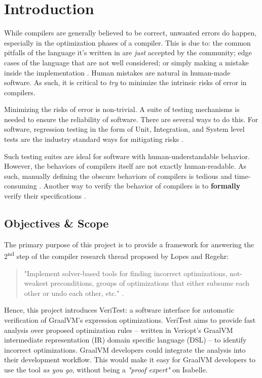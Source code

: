 \chapter{Introduction \label{sec:introduction}}

While compilers are generally believed to be correct, unwanted errors do happen, especially in the optimization phases of a compiler. 
This is due to: the common pitfalls of the 
language it's written in are \emph{just} accepted by the community; edge cases of the language that are not well considered; or simply making a 
mistake inside the implementation \cite[Sec. 1.2]{CompilerOptimization}. Human mistakes are natural in human-made software. As such, it is 
critical to \emph{try} to minimize the intrinsic risks of error in compilers.

Minimizing the risks of error is non-trivial. A suite of testing mechanisms is needed to ensure the reliability of software. 
There are several ways to do this. For software, regression testing in the form of Unit, Integration, and System level tests are the 
industry standard ways for mitigating risks \cite{testing}. 

Such testing suites are ideal for software with human-understandable behavior. However, 
the behaviors of compilers itself are not exactly human-readable. As such, manually defining the obscure behaviors of compilers is tedious and 
time-consuming \cite{compcertVerification}. Another way to verify the behavior of compilers is to \textbf{formally} 
verify their specifications \cite{compcertVerification}.

\section{Objectives \& Scope}

The primary purpose of this project is to provide a framework for answering the 2\textsuperscript{nd} step of the compiler research thread proposed by 
Lopes and Regehr:

\begin{quote}
    "Implement solver-based tools for finding incorrect optimizations, not-weakest
    preconditions, groups of optimizations that either subsume each other or
    undo each other, etc." \cite[p. 5]{CompilerOptimization}.
\end{quote}

Hence, this project introduces VeriTest: a software interface for automatic verification of GraalVM's expression optimizations. VeriTest aims to provide 
fast analysis over proposed optimization rules -- written in Veriopt's GraalVM intermediate representation (IR) domain specific language 
(DSL) \cite[Sec. 3]{Term_Graph_Optimizations} -- to identify incorrect optimizations. GraalVM developers could integrate the analysis into 
their development workflow. This would make it easy for GraalVM developers to use the tool \emph{as you go}, 
without being a \emph{"proof expert"} on Isabelle.

